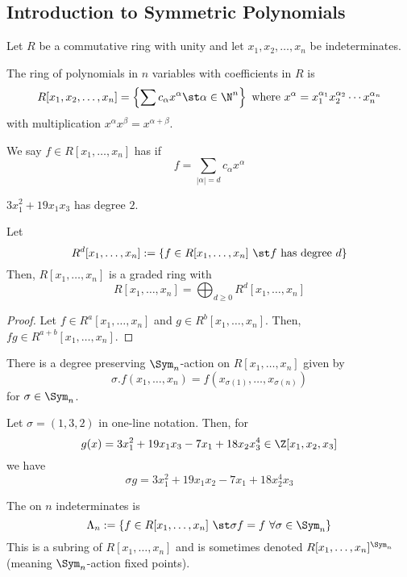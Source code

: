\documentclass[11pt,leqno,oneside]{amsart}
\numberwithin{thm}{section}
\newcommand{\sym}{\Lambda}
\begin{document}
\subsection{Introduction to Symmetric Polynomials}
Let \(R\) be a commutative ring with unity and let \(x_1, x_2, \ldots,
x_n\) be indeterminates.
\begin{defn}
  The ring of polynomials in \(n\) variables with coefficients in
  \(R\) is \[
    R[x_1, x_2, \ldots, x_n] = \left\{ \sum c_\alpha x^\alpha \st
      \alpha \in \N^n \right\} \text{ where } x^\alpha =
    x_1^{\alpha_1} x_2^{\alpha_2} \cdots x_n^{\alpha_n}
  \]
  with multiplication \(x^\alpha x^\beta = x^{\alpha+\beta}\).
\end{defn}
\begin{defn}
  We say \(f \in R[x_1, \ldots, x_n]\) has 
  if \[
    f = \sum_{|\alpha|=d} c_\alpha x^\alpha
  \]
\end{defn}
\begin{example}
  \(3x_1^2+19x_1x_3\) has degree \(2\).
\end{example}
\begin{prop}
  Let \[
    R^d[x_1, \ldots, x_n] := \{f \in R[x_1, \ldots, x_n]\ \st f \text{
      has degree }d\}
\]
Then, \(R[x_1, \ldots, x_n]\) is a graded ring with \[
  R[x_1, \ldots, x_n] = \bigoplus_{d \geq 0} R^d[x_1, \ldots, x_n]
\]
\end{prop}
\begin{proof}
  Let \(f \in R^a[x_1, \ldots, x_n]\) and \(g \in R^b[x_1, \ldots,
  x_n]\). Then, \(fg \in R^{a+b}[x_1, \ldots, x_n]\).
\end{proof}
\begin{prop}
  There is a degree preserving \(\Sym_n\)-action on \(R[x_1, \ldots,
  x_n]\) given by \[
    \sigma.f(x_1, \ldots, x_n) = f(x_{\sigma(1)}, \ldots, x_{\sigma(n)})
  \]
  for \(\sigma \in \Sym_n\). 
\end{prop}
\begin{example}
  Let \(\sigma = (1,3,2)\) in one-line notation. Then, for \[
    g(x) = 3x_1^2+19x_1x_3-7x_1+18x_2x_3^4 \in \Z[x_1,x_2,x_3]
  \]
  we have \[
    \sigma g = 3x_1^2+19x_1x_2-7x_1+18x_2^4x_3
  \]
\end{example}
\begin{defn}
  The  on \(n\) indeterminates is \[
    \sym_n := \{f \in R[x_1, \ldots, x_n]\ \st \sigma f = f\ \forall
  \sigma \in \Sym_n\} 
  \]
  This is a subring of \(R[x_1, \ldots, x_n]\) and is sometimes
  denoted \(R[x_1, \ldots, x_n]^{\Sym_n}\) (meaning \(\Sym_n\)-action
  fixed points).
\end{defn}
\end{document}
